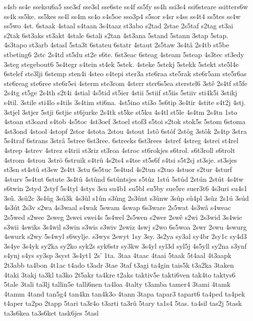 {s4sb
ss4e
sseksu6a5
sse3sf
sse3sl
sse6ste
ss4f
ss5fy
ss4h
ssi3s4
ssi6steare
ssitters6w
ss4k
ss5ke.
ss5kes
ss4l
ss4m
ss4o
s4s5oe
sso3p4
s5sor
s4sr
s4ss
ss4t4
ss5tes
ss4w
ss5wo
4st.
6staak
4staal
s4taan
3s4taaz
st3abo
s2tad
2stae
2s5taf
s2tag
st3ai
s2tak
6st3aks
st3akt
4stale
6stali
s2tan
4st3ana
5stand
5stann
3stap
5stap.
4s3tapo
st3arb
4stasl
5sta3t
6stateu
6statr
4staut
2s5taw
3s4tâ
2s4tb
st5be
stbeting6
2stc
2s4td
st5du
st2e
s6te.
6st3eac
6steag
4steam
5steap
4s3tec
st3edy
3steg
stegebout6
5s4tegr
s4tein
st4ek
5stek.
4steke
5stekj
5stekk
5stekt
ste5l4e
6stelef
ste3lji
6stemp
sten4i
4steo
s4tepi
ster3a
ste6raa
ste5rak
ste6r5am
ste5r6as
ste6reag
ste6ree
ste6r5ei
4sterm
ste3rom
4sterr
ster6s5ea
sterstel6
3stê
2s4tf
st5fe
2s4tg
st5ge
2s4th
s2t4i
4stial
4s5tid
st5ier
4stii
5stiif
st5iis
5stiiv
sti4k5i
3stikj
s4til.
3stile
sti4lo
s4tils
3s4tim
sti6na.
4st5ino
sti3o
5s6tip
3s4tir
4stite
s4t2j
4stj.
3stjel
3stjer
5stji
6stjie
st6jurke
2s4tk
st5ke
st5ku
4s4tl
st5le
4s4tm
2s4tn
1sto
4stoan
st3oard
s4tob
4s5toc
4st3oef
3stoel
stof3
s5toi
s2tok
stok5s
5stom
6stoma
4st3ond
4stool
4stopf
2stor
4stota
2stou
4stout
1stô
6stôf
2stôg
3stôk
2s4tp
3stra
5s4traf
6strans
3strâ
5stree
6st3ree.
6streeks
6st3rees
4stref
4streg
4strei
st4rel
4strep
4strev
4strez
s4trii
st3riz
st3roa
4stroc
st6rokjes
s6trol.
s6t3roll
s6trolt
4strom
4strou
3strö
6struik
s4trû
4s2ts4
s4tse
st5s6f
s4tsi
s5t2sj
st3sje.
st3sjes
st3sn
st4stû
st3sw
2s4tt
3stu
6s5tuc
5s4tud
4s2tun
s2tuo
4stuor
s2tur
4sturf
4sturv
5s4tut
6stute
3s4tû
4stûnd
6stûntsjes
s5tûz
1stú
5stúd
2stún
2stút
4s4tw
s6twin
2styd
2styf
5s4tyl
4stys
3su
su4b1
su5bl
su5by
sue5re
suer3t6
4s3uri
su4s1
3sû.
3sû2c
3s4ûg
3sû3k
4s3ûl
s1ûn
s3ûng
2s3ûnt
s3ûnw
3sûp
sû4pl
3sûz
2s1ú
3súd
4s3út
2s3v
s2wa
4s3waal
s4wak
5swam
4swap
6s3ware
2s5wat
4s3wâ
s4weac
2s5wed
s2wee
2sweg
2swei
swei4s
5s4wel
2s5wen
s2wer
2swê
s2wi
2s3wid
3s4wie
s3wii
4swiks
3s4wil
s3win
s3wis
s3wiv
2swiz
4swj
s2wo
6s5woa
2swr
2swu
4swurg
4swurk
s2wy
5s4wyl
s6wylje.
s3wys
2swyt
1sy
3sy.
3s2ya
sy3al
sy4br
2sy1c
sy4d3
3s4ye
3s4yk
sy2ka
sy2ko
syk2s
syk6str
sy3kw
3s4yl
syl3d
syl5j
4s5yll
sy2na
s3ynf
s4ynj
s4ys
sy3sp
3syst
3s4yt1
2s'
1ta.
3taa
4taac
4taai
5taak
5t4aal
4t3aapk
2t3abb
ta4bon
4t1ac
t4ado
t3adr
3tae
3taf
t3agi
ta4gin
tais5k
t3a2ka
3taken
4taki
3takj
ta3kl
ta3ko
2t5akr
ta4kre
t2aks
taktiv5e
takti6ven
tak4to
taktys6
5tale
3tali
ta3lj
tallin5e
talli6nen
ta4loa
4talty
t3amba
tamer4
3tami
4tamk
4tamm
4tand
tan5g4
tan4kn
tan4k3o
4tann
3tapa
tapar3
tapart6
ta4ped
ta4pek
t4aper
ta2po
2tapp
5tari
ta3r4o
t3arti
ta3rû
5tary
ta1s4
5tas.
ta4sil
tas2j
5task
ta3s6kea
ta3s6ket
task6jes
5tasl
}
